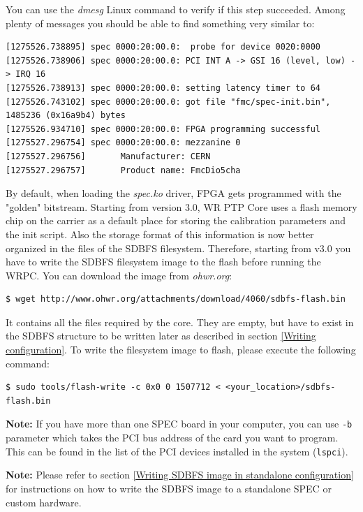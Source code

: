 \documentclass[a4paper, 12pt]{article}
\newcommand{\code}[1]{\texttt{#1}}
\begin{document}
You can use the \textit{dmesg} Linux command to verify if this step succeeded.
Among plenty of messages you should be able to find something very similar to:
\begin{lstlisting}[basicstyle=\scriptsize\ttfamily]
[1275526.738895] spec 0000:20:00.0:  probe for device 0020:0000
[1275526.738906] spec 0000:20:00.0: PCI INT A -> GSI 16 (level, low) -> IRQ 16
[1275526.738913] spec 0000:20:00.0: setting latency timer to 64
[1275526.743102] spec 0000:20:00.0: got file "fmc/spec-init.bin", 1485236 (0x16a9b4) bytes
[1275526.934710] spec 0000:20:00.0: FPGA programming successful
[1275527.296754] spec 0000:20:00.0: mezzanine 0
[1275527.296756]       Manufacturer: CERN
[1275527.296757]       Product name: FmcDio5cha
\end{lstlisting}


By default, when loading the \textit{spec.ko} driver, FPGA gets programmed with
the "golden" bitstream. Starting from version 3.0, WR PTP Core uses a flash
memory chip on the carrier as a default place for storing the calibration
parameters and the init script. Also the storage format of this information is
now better organized in the files of the SDBFS filesystem. Therefore, starting
from v3.0 you have to write the SDBFS filesystem image to the flash
before running the WRPC. You can download the image from \textit{ohwr.org}:
\begin{lstlisting}
$ wget http://www.ohwr.org/attachments/download/4060/sdbfs-flash.bin
\end{lstlisting}

It contains all the files required by the core. They are empty, but have to
exist in the SDBFS structure to be written later as described in section
\ref{Writing configuration}. To write the filesystem image to flash, please
execute the following command:
\begin{lstlisting}
$ sudo tools/flash-write -c 0x0 0 1507712 < <your_location>/sdbfs-flash.bin
\end{lstlisting}

\noindent\textbf{Note:} If you have more than one SPEC board in your computer,
you can use \code{-b} parameter which takes the PCI bus address of the card you
want to program. This can be found in the list of the PCI devices installed in
the system (\code{lspci}).

\noindent\textbf{Note:} Please refer to section \ref{Writing SDBFS image in
standalone configuration} for instructions on how to write the SDBFS image to a
standalone SPEC or custom hardware.\\
\end{document}
